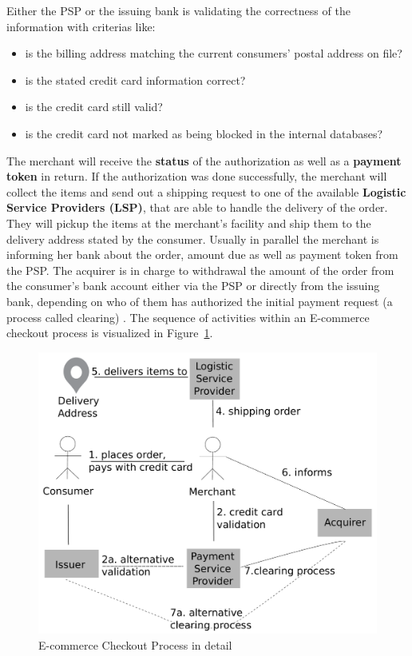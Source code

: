 Either the \gls{PSP} or the issuing bank is validating the correctness of the information with criterias like: \@

\begin{itemize}
    \item is the billing address matching the current consumers' postal address on file?
    \item is the stated credit card information correct?
    \item is the credit card still valid?
    \item is the credit card not marked as being blocked in the internal databases?
\end{itemize}

The merchant will receive the \textbf{status} of the authorization as well as a \textbf{payment token} in return. If the authorization was done successfully, the merchant will collect the items and send out a shipping request to one of the available \textbf{Logistic Service Providers (\gls{LSP})}, that are able to handle the delivery of the order. They will pickup the items at the merchant's facility and ship them to the delivery address stated by the consumer. Usually in parallel the merchant is informing her bank about the order, amount due as well as payment token from the \gls{PSP}. The acquirer is in charge to withdrawal the amount of the order from the consumer's bank account either via the \gls{PSP} or directly from the issuing bank, depending on who of them has authorized the initial payment request (a process called clearing) \citep{VisaPayment2014}. The sequence of activities within an E-commerce checkout process is visualized in Figure~\ref{fig:images_ecommerce_checkout_process}.\@

\begin{figure}[H]
	\centering
		\includegraphics[width=0.8\columnwidth]{images/e-commerce-checkout-process.pdf}
	\caption{E-commerce Checkout Process in detail}
\label{fig:images_ecommerce_checkout_process}
\end{figure}

